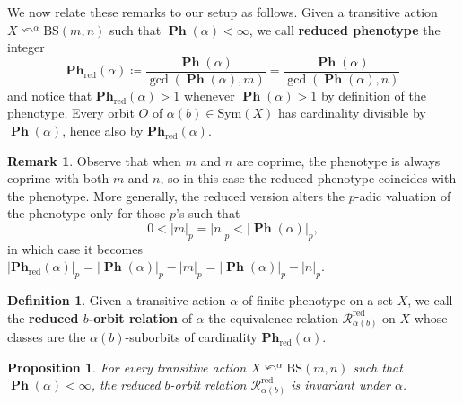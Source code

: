 \documentclass[12pt]{article}
\numberwithin{equation}{section}
\newtheorem{proposition}[equation]{Proposition}
\theoremstyle{definition}
\newtheorem{definition}[equation]{Definition}
\newtheorem{remark}[equation]{Remark}
\def\defin#1{\textbf{#1}}
\newcommand{\abs}[1]{\left\lvert #1\right\rvert}
\newcommand{\Rc}{\mathcal{R}}
\newcommand\BSo{\mathrm{BS}}
\DeclareMathOperator\PHE{\mathbf{Ph}}
\newcommand\PHEred{\mathbf{Ph}_{\textrm{red}}}
\newcommand{\Sym}{\mathrm{Sym}}
\begin{document}
    We now relate these remarks to our setup as follows.
    Given a transitive action $X\curvearrowleft^\alpha \BSo(m,n)$ such that  $\PHE(\alpha) < \infty$, we call \defin{reduced phenotype} the integer
    \begin{equation}\label{eq: def reduced phenotype}
        \PHEred(\alpha) \coloneqq \frac{\PHE(\alpha)}{\gcd(\PHE(\alpha), m)} 
        = \frac{\PHE(\alpha)}{\gcd(\PHE(\alpha), n)}
    \end{equation}
    and notice that $\PHEred(\alpha) > 1$ whenever $\PHE(\alpha) > 1$ by definition of the phenotype.
    Every orbit $O$ of $\alpha(b)\in\Sym(X)$ has cardinality divisible by $\PHE(\alpha)$, hence also by $\PHEred(\alpha)$.
	\begin{remark}
		Observe that when \( m \) and \( n \) are coprime,
		the phenotype is always coprime with both \( m \) and \( n \), so 
		in this case the reduced phenotype coincides with the phenotype. 
		More generally, the reduced version alters the $p$-adic valuation of the phenotype
		only for those \(p\)'s such that 
		\[
		0< \abs m_p=\abs n_p <\abs{\PHE(\alpha)}_p, 
		\]
		in which case it becomes 
		\( 
		\abs{\PHEred(\alpha)}_p = \abs{\PHE(\alpha)}_p-\abs{m}_p
								= \abs{\PHE(\alpha)}_p-\abs{n}_p
		\).
	\end{remark}
	\begin{definition}
        Given a transitive action \( \alpha \) of finite phenotype on a set \( X \),
        we call the \defin{reduced \( b \)-orbit relation} of \( \alpha \) the equivalence relation $\Rc^{\mathrm{red}}_{\alpha(b)}$ on \( X \)
        whose classes are the $\alpha(b)$-suborbits of cardinality $\PHEred(\alpha)$.
    \end{definition}
    \begin{proposition}\label{Prop: phenotypical relation is invariant}
        For every transitive action $X\curvearrowleft^\alpha \BSo(m,n)$ such that $\PHE(\alpha) < \infty$,
        the reduced \(b\)-orbit relation $\Rc^{\mathrm{red}}_{\alpha(b)}$ is invariant under \( \alpha \). 
    \end{proposition}
\end{document}

